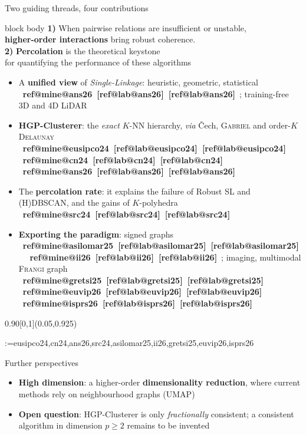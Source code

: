 \documentclass[A4,svgnames,9pt,aspectratio=169]{beamer}
\makeatletter
\newcommand{\refbracket}[1]{%
  \ifcsname ref@mine@#1\endcsname
    \textcolor{inria-rouge}{[\csname ref@lab@#1\endcsname]}%
  \else
    \textcolor{gris_fonce_inria}{[\csname ref@lab@#1\endcsname]}%
  \fi}
\newcommand{\citb}[1]{\mbox{{\footnotesize\bfseries\refbracket{#1}}}}
\newcommand{\reffoot}[1]{%
  \begin{textblock}{0.90}[0,1](0.05,0.925)%
    \begingroup
    \tiny\linespread{0.90}\selectfont\raggedright\color{gris_fonce_inria}%
    \setlength{\parindent}{0pt}\setlength{\parskip}{0pt}%
    \edef\rf@list{\zap@space#1 \@empty}%
    \@for\rf@key:=\rf@list\do{%
      \noindent{\bfseries\expandafter\refbracket\expandafter{\rf@key}}%
      \space\csname ref@full@\rf@key\endcsname\par}%
    \endgroup
  \end{textblock}}
\makeatother
\begin{document}
\begin{frame}[t]{Two guiding threads, four contributions}
    \vspace{-0.10cm}
    \begin{beamercolorbox}[rounded=true,sep=3pt]{block body}
        \centering\small
        \textbf{1)} When pairwise relations are insufficient or unstable,\\ \textbf{higher-order interactions} bring robust coherence.\\[3pt]
        \textbf{2)} \textbf{Percolation} is the theoretical keystone\\ for quantifying the performance of these algorithms
    \end{beamercolorbox}

    \vspace{0.06cm}
    \footnotesize
    \begin{itemize}
        \setlength{\itemsep}{3pt}
        \item A \textbf{unified view} of \emph{Single-Linkage}: heuristic, geometric, statistical \citb{ans26}; training-free 3D and 4D LiDAR
        \item \textbf{HGP-Clusterer}: the \emph{exact} $K$-NN hierarchy, \emph{via} \v{C}ech, \textsc{Gabriel} and order-$K$ \textsc{Delaunay} \citb{eusipco24} \citb{cn24} \citb{ans26}
        \item The \textbf{percolation rate}: it explains the failure of Robust SL and (H)DBSCAN, and the gains of $K$-polyhedra \citb{src24}
        \item \textbf{Exporting the paradigm}: signed graphs \citb{asilomar25} \citb{ii26}; imaging, multimodal \textsc{Frangi} graph \citb{gretsi25} \citb{euvip26} \citb{isprs26}
    \end{itemize}
    \reffoot{eusipco24,cn24,ans26,src24,asilomar25,ii26,gretsi25,euvip26,isprs26}
\end{frame}

\begin{frame}{Further perspectives}
    \begin{itemize}
        \setlength{\itemsep}{11pt}
        \item \textbf{High dimension}: a higher-order \textbf{dimensionality reduction},
        where current methods rely on neighbourhood graphs (UMAP)
        \item \textbf{Open question}: HGP-Clusterer is only \emph{fractionally} consistent;
        a consistent algorithm in dimension $p \ge 2$ remains to be invented
    \end{itemize}
\end{frame}
\end{document}
